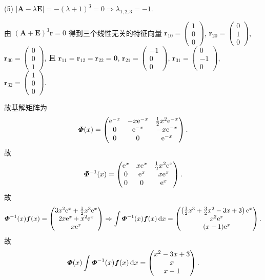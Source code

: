 \begin{solve}
  (5) $|\bm{A}-\lambda\bm{E}|=-(\lambda+1)^3=0\Rightarrow\lambda_{1,2,3}=-1$.

  由 $(\bm{A}+\bm{E})^3\bm{r}=0$ 得到三个线性无关的特征向量
  $\bm{r}_{10}=\begin{pmatrix}1\\0\\0\end{pmatrix}$,
  $\bm{r}_{20}=\begin{pmatrix}0\\1\\0\end{pmatrix}$,
  $\bm{r}_{30}=\begin{pmatrix}0\\0\\1\end{pmatrix}$, 
  且 $\bm{r}_{11}=\bm{r}_{12}=\bm{r}_{22}=\bm{0}$,
  $\bm{r}_{21}=\begin{pmatrix}-1\\0\\0\end{pmatrix}$,
  $\bm{r}_{31}=\begin{pmatrix}0\\-1\\0\end{pmatrix}$,
  $\bm{r}_{32}=\begin{pmatrix}1\\0\\0\end{pmatrix}$.

  故基解矩阵为
  \[\bm{\varPhi}(x) = 
  \begin{pmatrix}
    \mathrm{e}^{-x}&-x\mathrm{e}^{-x}&\frac{1}{2}x^2\mathrm{e}^{-x} \\
    0&\mathrm{e}^{-x}&-x\mathrm{e}^{-x} \\
    0&0&\mathrm{e}^{-x}
  \end{pmatrix}.\]
  故
  \[\bm{\varPhi}^{-1}(x) = 
  \begin{pmatrix}
    \mathrm{e}^x&x\mathrm{e}^x&\frac{1}{2}x^2\mathrm{e}^x \\
    0&\mathrm{e}^x&x\mathrm{e}^x \\
    0&0&\mathrm{e}^x
  \end{pmatrix}.\]
  故
  \[\bm{\varPhi}^{-1}(x)\bm{f}(x) =
  \begin{pmatrix}
    3x^2\mathrm{e}^x+\frac{1}{2}x^3\mathrm{e}^x \\
    2x\mathrm{e}^x+x^2\mathrm{e}^x \\
    x\mathrm{e}^x
  \end{pmatrix}\Rightarrow
  \int\bm{\varPhi}^{-1}(x)\bm{f}(x)\mathop{}\!\mathrm{d} x =
  \begin{pmatrix}
    \left(\frac{1}{2}x^3+\frac{3}{2}x^2-3x+3\right)\mathrm{e}^x \\
    x^2\mathrm{e}^x \\
    (x-1)\mathrm{e}^x
  \end{pmatrix}.\]
  故
  \[\bm{\varPhi}(x)\int\bm{\varPhi}^{-1}(x)\bm{f}(x)\mathop{}\!\mathrm{d} x=\begin{pmatrix}x^2-3x+3\\x\\x-1\end{pmatrix}.\]


\end{solve}
